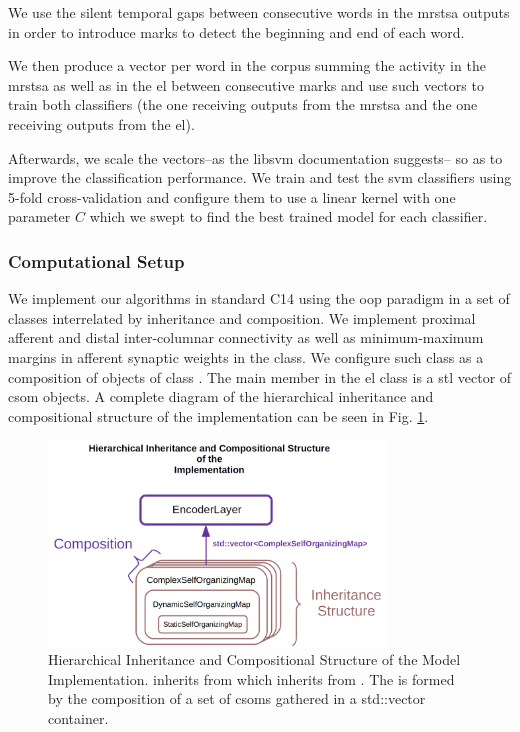 \documentclass[10pt,letterpaper]{article}
\newcommand{\CC}{C\nolinebreak\hspace{-.05em}\raisebox{.4ex}{\tiny\bf +}\nolinebreak\hspace{-.10em}\raisebox{.4ex}{\tiny\bf +}}
\begin{document}
We use the silent temporal gaps between consecutive words in the \gls{mrstsa} outputs in order to introduce marks to
detect the beginning and end of each word.

We then produce a vector per word in the corpus summing the activity in the \gls{mrstsa} as well as in the \gls{el} between consecutive marks
and use such vectors to train both classifiers (the one receiving outputs from the \gls{mrstsa} and the one receiving outputs from the \gls{el}).

Afterwards, we scale the vectors--as the \gls{libsvm} documentation suggests--
so as to improve the classification performance.
We train and test the \gls{svm} classifiers using 5-fold cross-validation
and configure them to use a linear kernel with one parameter $C$ which
we swept to find the best trained model for each classifier.










\subsubsection*{Computational Setup}
\label{Comp_setup}

We implement our algorithms in standard
\CC14 using the \gls{oop} paradigm in a set of classes interrelated by inheritance and composition.
We implement proximal afferent and distal inter-columnar connectivity  
as well as minimum-maximum margins in afferent synaptic weights in the  class.
We configure such class as a composition of objects of class .
The main member in the \gls{el} class is a \gls{stl} vector of \gls{csom} objects.
A complete diagram of the hierarchical inheritance and compositional structure of the implementation
can be seen in Fig. \ref{fig:Skeleton}.

\begin{figure}[h!]
    \centering
    \includegraphics[width=0.8\textwidth]{Skeleton.png}
    \caption{Hierarchical Inheritance and Compositional Structure of the Model Implementation.
     inherits from  which inherits from .
    The  is formed by the composition of a set of \glspl{csom} gathered
    in a std::vector  container.}
    \label{fig:Skeleton}
\end{figure}
\end{document}
